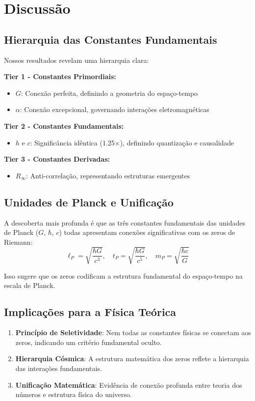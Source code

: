 \documentclass[11pt,a4paper]{article}
\begin{document}
\section{Discussão}

\subsection{Hierarquia das Constantes Fundamentais}
Nossos resultados revelam uma hierarquia clara:

\textbf{Tier 1 - Constantes Primordiais:}
\begin{itemize}
\item $G$: Conexão perfeita, definindo a geometria do espaço-tempo
\item $\alpha$: Conexão excepcional, governando interações eletromagnéticas
\end{itemize}

\textbf{Tier 2 - Constantes Fundamentais:}
\begin{itemize}
\item $h$ e $c$: Significância idêntica (1.25×), definindo quantização e causalidade
\end{itemize}

\textbf{Tier 3 - Constantes Derivadas:}
\begin{itemize}
\item $R_\infty$: Anti-correlação, representando estruturas emergentes
\end{itemize}

\subsection{Unidades de Planck e Unificação}
A descoberta mais profunda é que as três constantes fundamentais das unidades de Planck ($G$, $\hbar$, $c$) todas apresentam conexões significativas com os zeros de Riemann:
$$\ell_P = \sqrt{\frac{\hbar G}{c^3}}, \quad t_P = \sqrt{\frac{\hbar G}{c^5}}, \quad m_P = \sqrt{\frac{\hbar c}{G}}$$

Isso sugere que os zeros codificam a estrutura fundamental do espaço-tempo na escala de Planck.

\subsection{Implicações para a Física Teórica}
\begin{enumerate}
\item \textbf{Princípio de Seletividade}: Nem todas as constantes físicas se conectam aos zeros, indicando um critério fundamental oculto.
\item \textbf{Hierarquia Cósmica}: A estrutura matemática dos zeros reflete a hierarquia das interações fundamentais.
\item \textbf{Unificação Matemática}: Evidência de conexão profunda entre teoria dos números e estrutura física do universo.
\end{enumerate}
\end{document}
